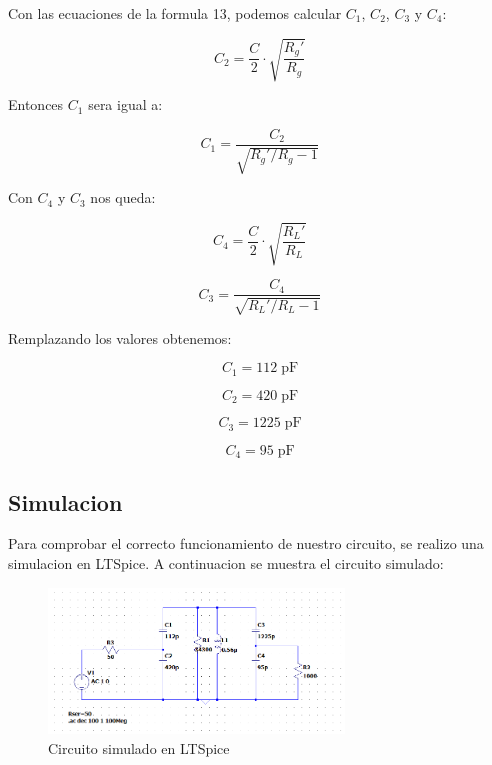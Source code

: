 Con las ecuaciones de la formula 13, podemos calcular $C_1$, $C_2$, $C_3$ y $C_4$:

\begin{equation}
    C_2 = \frac{C}{2} \cdot \sqrt{\frac{R_g'}{R_g}}
\end{equation}

Entonces $C_1$ sera igual a: 

\begin{equation}
    C_1 = \frac{C_2}{\sqrt{R_g' / R_g - 1}}
\end{equation}

Con $C_4$ y $C_3$ nos queda:

\begin{equation}
    C_4 = \frac{C}{2} \cdot \sqrt{\frac{R_L'}{R_L}}
\end{equation}

\begin{equation}
    C_3 = \frac{C_4}{\sqrt{R_L' / R_L - 1}}
\end{equation}

Remplazando los valores obtenemos:


\begin{equation}
    C_1 = 112\; \text{pF}
\end{equation}

\begin{equation}
    C_2 = 420\; \text{pF}
\end{equation}

\begin{equation}
    C_3 = 1225\; \text{pF}
\end{equation}

\begin{equation}
    C_4 = 95\; \text{pF}
\end{equation}

\newpage
\subsection{Simulacion}

Para comprobar el correcto funcionamiento de nuestro circuito, se realizo una simulacion en LTSpice. A continuacion se muestra el circuito simulado:

\begin{figure}[h]
    \centering
    \includegraphics[width=0.7\textwidth]{Imagenes/circuito.png}
    \caption{Circuito simulado en LTSpice}
\end{figure}

